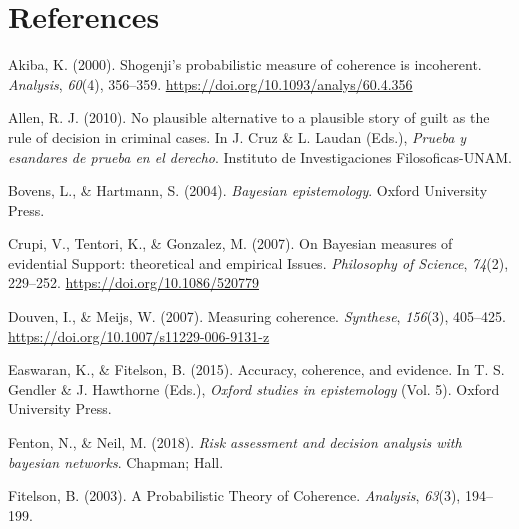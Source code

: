 \documentclass[
  10pt,
]{scrartcl}
\newlength{\cslhangindent}
\newlength{\cslentryspacingunit} %
\newenvironment{CSLReferences}[2] %
 {%
  \setlength{\parindent}{0pt}
  \ifodd #1
  \let\oldpar\par
  \def\par{\hangindent=\cslhangindent\oldpar}
  \fi
  \setlength{\parskip}{#2\cslentryspacingunit}
 }%
 {}
\begin{document}
\vspace{2mm}

\hypertarget{references}{%
\section*{References}\label{references}}

\hypertarget{refs}{}
\begin{CSLReferences}{1}{0}
\leavevmode{}%
Akiba, K. (2000). Shogenji's probabilistic measure of coherence is incoherent. \emph{Analysis}, \emph{60}(4), 356--359. \url{https://doi.org/10.1093/analys/60.4.356}

\leavevmode{}%
Allen, R. J. (2010). No plausible alternative to a plausible story of guilt as the rule of decision in criminal cases. In J. Cruz \& L. Laudan (Eds.), \emph{Prueba y esandares de prueba en el derecho}. Instituto de Investigaciones Filosoficas-UNAM.

\leavevmode{}%
Bovens, L., \& Hartmann, S. (2004). \emph{Bayesian epistemology}. Oxford University Press.

\leavevmode{}%
Crupi, V., Tentori, K., \& Gonzalez, M. (2007). On {Bayesian measures} of {evidential Support}: {theoretical} and {empirical Issues}. \emph{Philosophy of Science}, \emph{74}(2), 229--252. \url{https://doi.org/10.1086/520779}

\leavevmode{}%
Douven, I., \& Meijs, W. (2007). Measuring coherence. \emph{Synthese}, \emph{156}(3), 405--425. \url{https://doi.org/10.1007/s11229-006-9131-z}

\leavevmode{}%
Easwaran, K., \& Fitelson, B. (2015). Accuracy, coherence, and evidence. In T. S. Gendler \& J. Hawthorne (Eds.), \emph{Oxford studies in epistemology} (Vol. 5). Oxford University Press.

\leavevmode{}%
Fenton, N., \& Neil, M. (2018). \emph{Risk assessment and decision analysis with bayesian networks}. Chapman; Hall.

\leavevmode{}%
Fitelson, B. (2003). A {Probabilistic Theory} of {Coherence}. \emph{Analysis}, \emph{63}(3), 194--199.


\end{CSLReferences}
\end{document}
